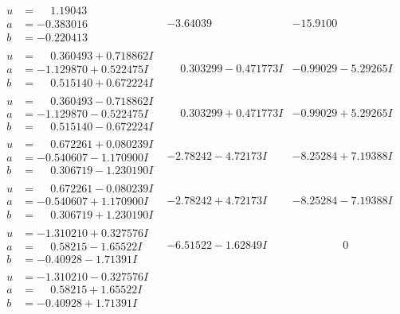 \documentclass[1p]{elsarticle_modified}
\theoremstyle{definition}
\begin{document}
$$\begin{array}{c|c|c}
\begin{aligned}
u &= \phantom{-}1.19043\phantom{ +0.000000I} \\
a &= -0.383016\phantom{ +0.000000I} \\
b &= -0.220413\phantom{ +0.000000I}\end{aligned}
 & -3.64039\phantom{ +0.000000I} & -15.9100\phantom{ +0.000000I} \\ \hline\begin{aligned}
u &= \phantom{-}0.360493 + 0.718862 I \\
a &= -1.129870 + 0.522475 I \\
b &= \phantom{-}0.515140 + 0.672224 I\end{aligned}
 & \phantom{-}0.303299 - 0.471773 I & -0.99029 - 5.29265 I \\ \hline\begin{aligned}
u &= \phantom{-}0.360493 - 0.718862 I \\
a &= -1.129870 - 0.522475 I \\
b &= \phantom{-}0.515140 - 0.672224 I\end{aligned}
 & \phantom{-}0.303299 + 0.471773 I & -0.99029 + 5.29265 I \\ \hline\begin{aligned}
u &= \phantom{-}0.672261 + 0.080239 I \\
a &= -0.540607 - 1.170900 I \\
b &= \phantom{-}0.306719 - 1.230190 I\end{aligned}
 & -2.78242 - 4.72173 I & -8.25284 + 7.19388 I \\ \hline\begin{aligned}
u &= \phantom{-}0.672261 - 0.080239 I \\
a &= -0.540607 + 1.170900 I \\
b &= \phantom{-}0.306719 + 1.230190 I\end{aligned}
 & -2.78242 + 4.72173 I & -8.25284 - 7.19388 I \\ \hline\begin{aligned}
u &= -1.310210 + 0.327576 I \\
a &= \phantom{-}0.58215 - 1.65522 I \\
b &= -0.40928 - 1.71391 I\end{aligned}
 & -6.51522 - 1.62849 I & \phantom{-0.000000 } 0 \\ \hline\begin{aligned}
u &= -1.310210 - 0.327576 I \\
a &= \phantom{-}0.58215 + 1.65522 I \\
b &= -0.40928 + 1.71391 I\end{aligned}

\end{array}$$
\end{document}
